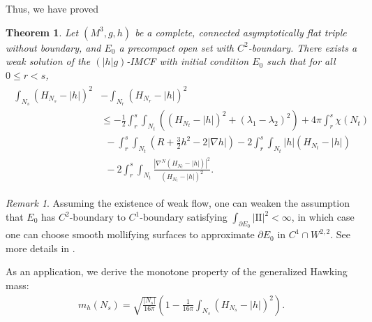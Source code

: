 \documentclass[11pt, letterpaper]{amsart}
\newtheorem{thm}{Theorem}[section]
\theoremstyle{definition}
\theoremstyle{remark}
\newtheorem{rmk}{Remark}[section]
\begin{document}
Thus, we have proved
\begin{thm}\label{thm-growth}
	Let $(M^3, g, h)$ be a complete, connected asymptotically flat triple without boundary, and $E_0$ a precompact open set with $C^2$-boundary. There exists a weak solution of the $(|h|g)$-IMCF with initial condition $E_0$ such that for all $0\leq r< s$,
\begin{align}\label{monotone-H-h}
	\begin{split}
		\int_{N_s}  (H_{N_s} - |h| )^2 & - \int_{{N}_r}  (H_{{N}_r} - |h| )^2 \\ 
					       & \leq -\frac{1}{2} \int_{r}^{s} \int_{N_t} \left(  (H_{N_t}-|h|)^2 + (\lambda _1-\lambda _2)^2 \right) + 4 \pi \int_{r}^{s} \chi (N_t)\\
					       &\ \ - \int_{r}^{s} \int_{N_t} \left( R + \frac{3}{2} h ^2 - 2|\nabla h| \right) - 2 \int_{r}^{s} \int_{N_t} |h| (H_{N_t}- |h|)  \\
					       &\ \ - 2 \int_{r}^{s} \int_{{N}_t}   \frac{|{\nabla }^{N} (H_{{N}_t} -|h|)|^2}{(H_{{N}_t} - |h|)^2} .
	\end{split}
\end{align}
\end{thm}

\begin{rmk}\label{rmk-C1-smoothing}
	Assuming the existence of weak flow, one can weaken the assumption that $E_0$ has $C^2$-boundary to $C^{1}$-boundary satisfying $\int_{\partial E_0} |\mathrm{II}|^2 < \infty$, in which case one can choose smooth mollifying surfaces to approximate $\partial E_0$ in $C^1 \cap W^{2,2}$. See more details in \cite[Section 5]{HI01}.
\end{rmk}





As an application, we derive the monotone property of the generalized Hawking mass:
\begin{align}\label{H-mass}
	m_{h}(N_s) = \sqrt{\frac{|N_s|}{16 \pi }} \left( 1- \frac{1}{16 \pi } \int_{N_s}(H_{N_s}- |h|)^2 \right).
\end{align}
\end{document}
